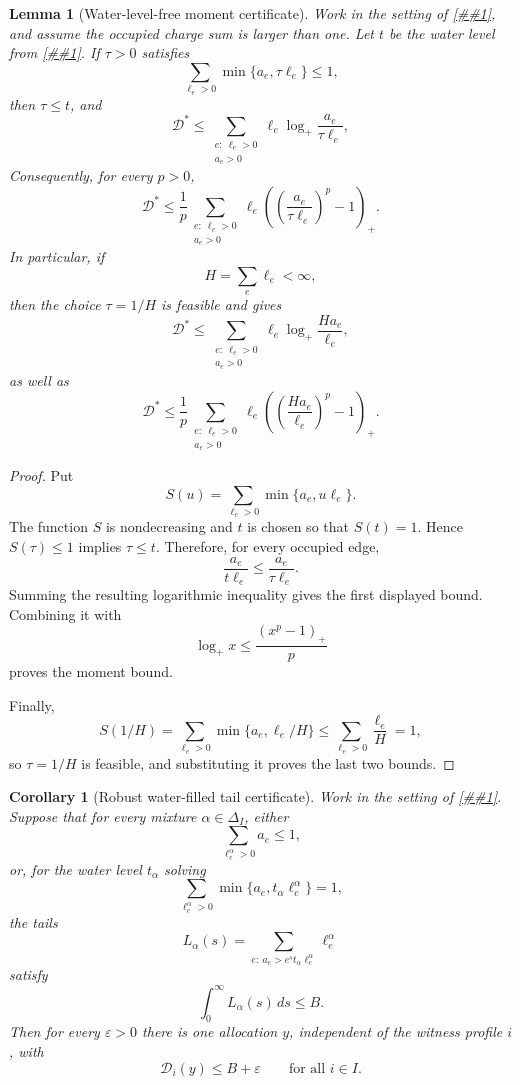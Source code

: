 \documentclass[10pt]{article}
\newcommand{\cref}[1]{\ref{##1}}
\newtheorem{lemma}[theorem]{Lemma}
\newtheorem{corollary}[theorem]{Corollary}
\theoremstyle{definition}
\begin{document}
\begin{lemma}[Water-level-free moment certificate]
   \label{lem:waterfilled-raw-moment-certificate}
   Work in the setting of \cref{lem:waterfilled-allocation}, and assume the
   occupied charge sum is larger than one.  Let \(t\) be the water level from
   \cref{lem:waterfilled-allocation}.  If \(\tau>0\) satisfies
   \[
      \sum_{\ell_e>0}\min\{a_e,\tau\ell_e\}\le1,
   \]
   then \(\tau\le t\), and
   \[
      \mathcal D^*
      \le
      \sum_{\substack{e:\ \ell_e>0\\ a_e>0}}
      \ell_e
      \log_+\frac{a_e}{\tau\ell_e},
   \]
   Consequently, for every \(p>0\),
   \[
      \mathcal D^*
      \le
      \frac1p
      \sum_{\substack{e:\ \ell_e>0\\ a_e>0}}
      \ell_e
      \left(
      \left(\frac{a_e}{\tau\ell_e}\right)^p-1
      \right)_+ .
   \]
   In particular, if
   \[
      H=\sum_e\ell_e<\infty,
   \]
   then the choice \(\tau=1/H\) is feasible and gives
   \[
      \mathcal D^*
      \le
      \sum_{\substack{e:\ \ell_e>0\\ a_e>0}}
      \ell_e
      \log_+\frac{H a_e}{\ell_e},
   \]
   as well as
   \[
      \mathcal D^*
      \le
      \frac1p
      \sum_{\substack{e:\ \ell_e>0\\ a_e>0}}
      \ell_e
      \left(
      \left(\frac{H a_e}{\ell_e}\right)^p-1
      \right)_+ .
   \]
\end{lemma}

\begin{proof}
   Put
   \[
      S(u)=\sum_{\ell_e>0}\min\{a_e,u\ell_e\}.
   \]
   The function \(S\) is nondecreasing and \(t\) is chosen so that
   \(S(t)=1\).  Hence \(S(\tau)\le1\) implies \(\tau\le t\).  Therefore, for
   every occupied edge,
   \[
      \frac{a_e}{t\ell_e}\le \frac{a_e}{\tau\ell_e}.
   \]
   Summing the resulting logarithmic inequality gives the first displayed
   bound. Combining it with
   \[
      \log_+x\le\frac{(x^p-1)_+}{p}
   \]
   proves the moment bound.

   Finally,
   \[
      S(1/H)
      =
      \sum_{\ell_e>0}\min\{a_e,\ell_e/H\}
      \le
      \sum_{\ell_e>0}\frac{\ell_e}{H}
      =
      1,
   \]
   so \(\tau=1/H\) is feasible, and substituting it proves the last two
   bounds.
\end{proof}

\begin{corollary}[Robust water-filled tail certificate]
   \label{cor:robust-waterfilled-tail}
   Work in the setting of \cref{lem:robust-waterfilled-minimax}.  Suppose that
   for every mixture \(\alpha\in\Delta_I\), either
   \[
      \sum_{\ell^\alpha_e>0}a_e\le1,
   \]
   or, for the water level \(t_\alpha\) solving
   \[
      \sum_{\ell^\alpha_e>0}\min\{a_e,t_\alpha\ell^\alpha_e\}=1,
   \]
   the tails
   \[
      L_\alpha(s)
      =
      \sum_{e:\ a_e>e^s t_\alpha\ell^\alpha_e}
      \ell^\alpha_e
   \]
   satisfy
   \[
      \int_0^\infty L_\alpha(s)\,ds\le B .
   \]
   Then for every \(\varepsilon>0\) there is one allocation \(y\), independent
   of the witness profile \(i\), with
   \[
      \mathcal D_i(y)\le B+\varepsilon
      \qquad\text{for all }i\in I.
   \]
\end{corollary}
\end{document}
